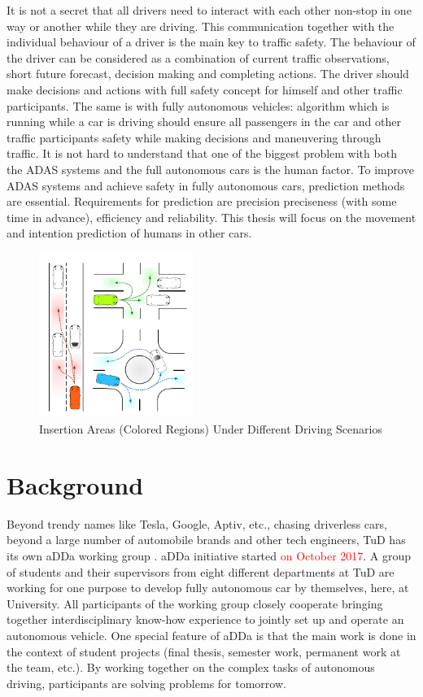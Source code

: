 It is not a secret that all drivers need to interact with each other non-stop in one way or another while they are driving. This communication together with the individual behaviour of a driver is the main key to traffic safety. The behaviour of the driver can be considered as a combination of current traffic observations, short future forecast, decision making and completing actions. The driver should make decisions and actions with full safety concept for himself and other traffic participants. The same is with fully autonomous vehicles: algorithm which is running while a car is driving should ensure all passengers in the car and other traffic participants safety while making decisions and maneuvering through traffic. It is not hard to understand that one of the biggest problem with both the \gls{ADAS} systems and the full autonomous cars is the human factor. To improve \gls{ADAS} systems and achieve safety in fully autonomous cars, prediction methods are essential. Requirements for prediction are precision preciseness (with some time in advance), efficiency and reliability. This thesis will focus on the movement and intention prediction of humans in other cars.

\begin{figure}[h]
	\centering  	
	\includegraphics[width=5cm]{img/4.jpg}
	\caption{Insertion Areas (Colored Regions) Under Different Driving Scenarios \cite{pic}}
	\label{fig:intersectionAreas}    
\end{figure}

\section{Background}

Beyond trendy names like Tesla, Google, Aptiv, etc., chasing driverless cars, beyond a large number of automobile brands and other tech engineers, \gls{TuD} has its own \gls{aDDa} working group \cite{aDDa}. \gls{aDDa} initiative started \textcolor{red}{on October 2017}. A group of students and their supervisors from eight different departments at \gls{TuD} are working for one purpose to develop fully autonomous car by themselves, here, at University. All participants of the working group closely cooperate bringing together interdisciplinary know-how experience to jointly set up and operate an autonomous vehicle. One special feature of \gls{aDDa} is that the main work is done in the context of student projects (final thesis, semester work, permanent work at the team, etc.). By working together on the complex tasks of autonomous driving, participants are solving problems for tomorrow. \\

